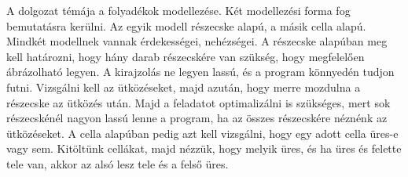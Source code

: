 
A dolgozat témája a folyadékok modellezése. Két modellezési forma fog bemutatásra kerülni. Az egyik modell részecske alapú, a másik cella alapú. Mindkét modellnek vannak érdekességei, nehézségei. A részecske alapúban meg kell határozni, hogy hány darab részecskére van szükség, hogy megfelelően ábrázolható legyen. A kirajzolás ne legyen lassú, és a program könnyedén tudjon futni. Vizsgálni kell az ütközéseket, majd azután, hogy merre mozdulna a részecske az ütközés után. Majd a feladatot optimalizálni is szükséges, mert sok részecskénél nagyon lassú lenne a program, ha az összes részecskére néznénk az ütközéseket. A cella alapúban pedig azt kell vizsgálni, hogy egy adott cella üres-e vagy sem. Kitöltünk cellákat, majd nézzük, hogy melyik üres, és ha üres és felette tele van, akkor az alsó lesz tele és a felső üres. 